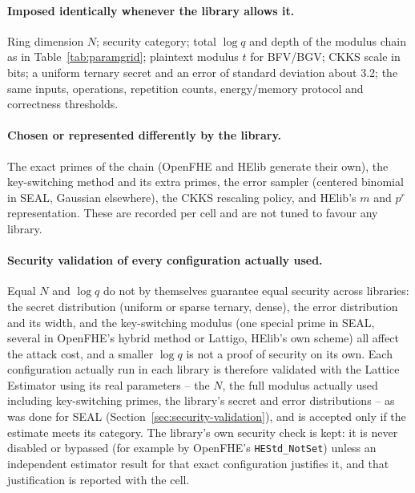 \paragraph{Imposed identically whenever the library allows it.} Ring dimension $N$; security category; total $\log q$ and depth of the modulus chain as in Table~\ref{tab:paramgrid}; plaintext modulus $t$ for BFV/BGV; CKKS scale in bits; a uniform ternary secret and an error of standard deviation about 3.2; the same inputs, operations, repetition counts, energy/memory protocol and correctness thresholds.

\paragraph{Chosen or represented differently by the library.} The exact primes of the chain (OpenFHE and HElib generate their own), the key-switching method and its extra primes, the error sampler (centered binomial in SEAL, Gaussian elsewhere), the CKKS rescaling policy, and HElib's $m$ and $p^r$ representation. These are recorded per cell and are not tuned to favour any library.

\paragraph{Security validation of every configuration actually used.} Equal $N$ and $\log q$ do not by themselves guarantee equal security across libraries: the secret distribution (uniform or sparse ternary, dense), the error distribution and its width, and the key-switching modulus (one special prime in SEAL, several in OpenFHE's hybrid method or Lattigo, HElib's own scheme) all affect the attack cost, and a smaller $\log q$ is not a proof of security on its own. Each configuration actually run in each library is therefore validated with the Lattice Estimator using its real parameters -- the $N$, the full modulus actually used including key-switching primes, the library's secret and error distributions -- as was done for SEAL (Section~\ref{sec:security-validation}), and is accepted only if the estimate meets its category. The library's own security check is kept: it is never disabled or bypassed (for example by OpenFHE's \texttt{HEStd\_NotSet}) unless an independent estimator result for that exact configuration justifies it, and that justification is reported with the cell.

